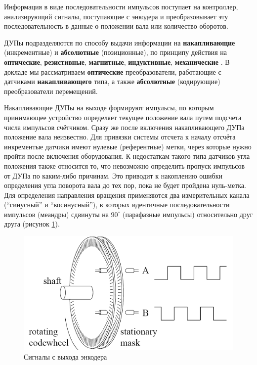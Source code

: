 Информация в виде последовательности импульсов поступает на контроллер, анализирующий сигналы, поступающие с энкодера и преобразовывает эту последовательность в данные о положении вала или количество оборотов.

ДУПы подразделяются по способу выдачи информации на \textbf{накапливающие} (инкрементные) и \textbf{абсолютные} (позиционные), по принципу действия на \textbf{оптические}, \textbf{резистивные}, \textbf{магнитные}, \textbf{индуктивные}, \textbf{механические} \cite{wiki:rotary}. В докладе мы рассматриваем \textbf{оптические} преобразователи, работающие с датчиками \textbf{накапливающего} типа, а также \textbf{абсолютные} (кодирующие) преобразователи перемещений.

Накапливающие ДУПы на выходе формируют импульсы, по которым принимающее устройство определяет текущее положение вала путем подсчета числа импульсов счётчиком. Сразу же после включения накапливающего ДУПа положение вала неизвестно. Для привязки системы отсчета к началу отсчёта инкрементые датчики имеют нулевые (референтные) метки, через которые нужно пройти после включения оборудования. К недостаткам такого типа датчиков угла положения также относится то, что невозможно определить пропуск импульсов от ДУПа по каким-либо причинам. Это приводит к накоплению ошибки определения угла поворота вала до тех пор, пока не будет пройдена нуль-метка. Для определения направления вращения применяются два измерительных канала (``синусный'' и ``косинусный''), в которых идентичные последовательности импульсов (меандры) сдвинуты на $90^{\circ}$ (парафазные импульсы) относительно друг друга (рисунок \ref{fig:meandr}).

\begin{figure}[ht]
    \includegraphics[width=1\linewidth]{Figures/meandr.png}
    \caption{Сигналы с выхода энкодера\label{fig:meandr}}
\end{figure}

